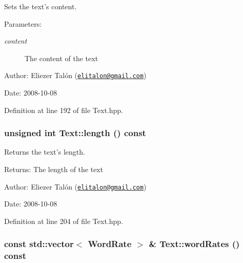Sets the text's content. 

\begin{Desc}
\item[Parameters:]
\begin{description}
\item[{\em content}]The content of the text\end{description}
\end{Desc}
\begin{Desc}
\item[Author:]Eliezer Talón (\href{mailto:elitalon@gmail.com}{\tt elitalon@gmail.com}) \end{Desc}
\begin{Desc}
\item[Date:]2008-10-08 \end{Desc}


Definition at line 192 of file Text.hpp.\hypertarget{class_text_8d76db538f8617fb8880ba3e4ff3e6a5}{
\subsubsection[length]{\setlength{\rightskip}{0pt plus 5cm}unsigned int Text::length () const}}
\label{class_text_8d76db538f8617fb8880ba3e4ff3e6a5}


Returns the text's length. 

\begin{Desc}
\item[Returns:]The length of the text\end{Desc}
\begin{Desc}
\item[Author:]Eliezer Talón (\href{mailto:elitalon@gmail.com}{\tt elitalon@gmail.com}) \end{Desc}
\begin{Desc}
\item[Date:]2008-10-08 \end{Desc}


Definition at line 204 of file Text.hpp.\hypertarget{class_text_46d23c2236172369e2dc57a4baf10f6c}{
\subsubsection[wordRates]{\setlength{\rightskip}{0pt plus 5cm}const std::vector$<$ {\bf WordRate} $>$ \& Text::wordRates () const}}
\label{class_text_46d23c2236172369e2dc57a4baf10f6c}



